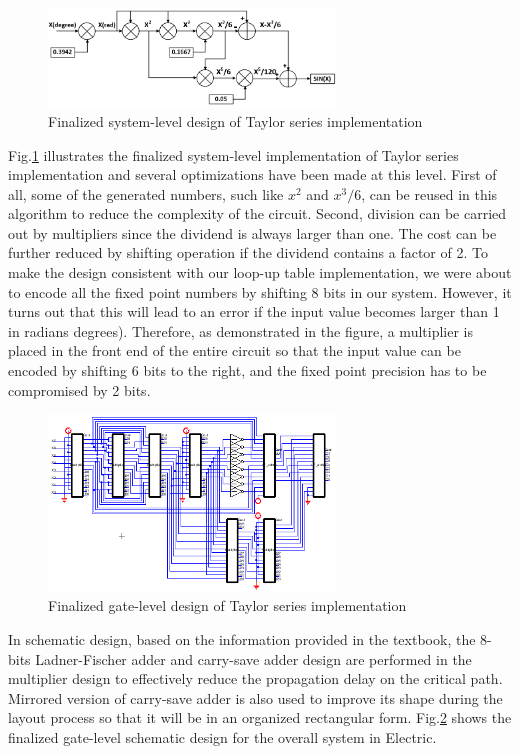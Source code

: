 \documentclass[10pt,journal]{IEEEtran}
\begin{document}
\begin{figure}[h]
\centering
\includegraphics[width=3in]{finalized_design.png}
\caption{Finalized system-level design of Taylor series implementation}
\label{finalized_design}
\end{figure}

Fig.\ref{finalized_design} illustrates the finalized system-level implementation of Taylor series implementation and several optimizations have been made at this level. First of all, some of the generated numbers, such like $x^2$ and $x^3/6$, can be reused in this algorithm to reduce the complexity of the circuit. Second, division can be carried out by multipliers since the dividend is always larger than one. The cost can be further reduced by shifting operation if the dividend contains a factor of 2. To make the design consistent with our loop-up table implementation, we were about to encode all the fixed point numbers by shifting 8 bits in our system. However, it turns out that this will lead to an error if the input value becomes larger than 1 in radians degrees). Therefore, as demonstrated in the figure, a multiplier is placed in the front end of the entire circuit so that the input value can be encoded by shifting 6 bits to the right, and the fixed point precision has to be compromised by 2 bits.

\begin{figure}[h]
\centering
\includegraphics[width=3in]{finalized_gate_design.png}
\caption{Finalized gate-level design of Taylor series implementation}
\label{finalized_gate_design}
\end{figure}

In schematic design, based on the information provided in the textbook, the 8-bits Ladner-Fischer adder and carry-save adder design are performed in the multiplier design to effectively reduce the propagation delay on the critical path. Mirrored version of carry-save adder is also used to improve its shape during the layout process so that it will be in an organized rectangular form. Fig.\ref{finalized_gate_design} shows the finalized gate-level schematic design for the overall system in Electric.
\end{document}
